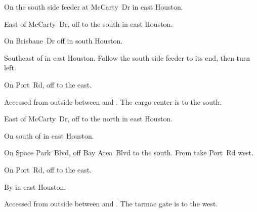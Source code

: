 
\begin{LocationList}

On the south side  feeder at McCarty~Dr in east Houston.

\Location{\GarageHQ \Garage}
East of McCarty~Dr, off  to the south in east Houston.

On Brisbane~Dr off  in south Houston.

Southeast of   in east Houston.
Follow the south side feeder to its end, then turn left.

On Port~Rd, off  to the east.

Accessed from  outside  between  and .
The cargo center is to the south.

\Location{\RecruitmentAgency \Recruitment}
East of McCarty~Dr, off  to the north in east Houston.

On  south of  in east Houston.

On Space Park~Blvd, off Bay Area~Blvd to the south.
From  take Port~Rd west.

On Port~Rd, off  to the east.

\Location{\TruckStop \Gas \Rest \Weigh}
By   in east Houston.

Accessed from  outside  between  and .
The tarmac gate is to the west.

\end{LocationList}
